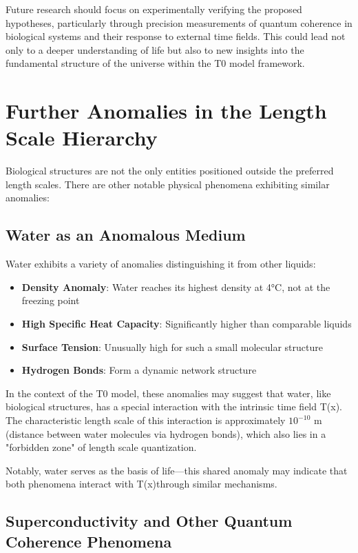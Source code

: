 \documentclass[12pt,a4paper]{article}
\newcommand{\Tfield}{T(x)}
\begin{document}
	Future research should focus on experimentally verifying the proposed hypotheses, particularly through precision measurements of quantum coherence in biological systems and their response to external time fields. This could lead not only to a deeper understanding of life but also to new insights into the fundamental structure of the universe within the T0 model framework.
	
	\section{Further Anomalies in the Length Scale Hierarchy}
	\label{sec:weitere_anomalien}
	
	Biological structures are not the only entities positioned outside the preferred length scales. There are other notable physical phenomena exhibiting similar anomalies:
	
	\subsection{Water as an Anomalous Medium}
	\label{subsec:wasser_anomal}
	
	Water exhibits a variety of anomalies distinguishing it from other liquids:
	
	\begin{itemize}
		\item \textbf{Density Anomaly}: Water reaches its highest density at 4°C, not at the freezing point
		\item \textbf{High Specific Heat Capacity}: Significantly higher than comparable liquids
		\item \textbf{Surface Tension}: Unusually high for such a small molecular structure
		\item \textbf{Hydrogen Bonds}: Form a dynamic network structure
	\end{itemize}
	
	In the context of the T0 model, these anomalies may suggest that water, like biological structures, has a special interaction with the intrinsic time field \Tfield. The characteristic length scale of this interaction is approximately $10^{-10}$ m (distance between water molecules via hydrogen bonds), which also lies in a "forbidden zone" of length scale quantization.
	
	Notably, water serves as the basis of life—this shared anomaly may indicate that both phenomena interact with \Tfield through similar mechanisms.
	
	\subsection{Superconductivity and Other Quantum Coherence Phenomena}
	\label{subsec:supraleitung}
	
\end{document}
